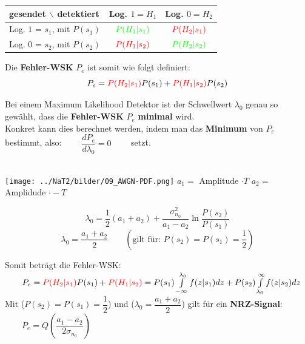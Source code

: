 \begin{minipage}[c]{10cm}
	\begin{center}
	 	\begin{tabular}{|l|c|c|}
			\hline
				gesendet $\backslash$ detektiert & Log. $1 = H_1$ & Log. $0 = H_2$ \\
			\hline
				Log. $1$ = $s_1$, mit $P(s_1)$ & $\textcolor{green}{P(H_1 | s_1)}$ 
												&  $\textcolor{red}{P(H_2 | s_1)}$\\
			\hline
				Log. $0$ = $s_2$, mit $P(s_2)$ & $\textcolor{red}{P(H_1 | s_2)}$ 
												& $\textcolor{green}{P(H_2 | s_2)}$ \\
			\hline
		\end{tabular}  
  	\end{center}
\end{minipage}
\begin{minipage}[c]{8cm}
	Die \textbf{Fehler-WSK} $P_e$ ist somit wie folgt definiert:
	$$ P_e = \textcolor{red}{P(H_2 | s_1)} P(s_1) + \textcolor{red}{P(H_1 | s_2)}
	P(s_2)$$
\end{minipage} 

Bei einem Maximum Likelihood Detektor ist der Schwellwert $\lambda_0$ genau so gewählt, dass die
\textbf{Fehler-WSK }$P_e$ \textbf{minimal} wird. \\
Konkret kann dies berechnet werden, indem man das \textbf{Minimum} von $P_e$ bestimmt, also: $\qquad
\dfrac{d P_e}{d \lambda_0} = 0 \qquad$ setzt. \\ \\

\begin{minipage}[c]{9.5cm}
 	\texttt{[image: ../NaT2/bilder/09\_AWGN-PDF.png]} \newline
 	$a_1 = $ Amplitude $\cdot T$ \newline
 	$a_2 = $ Amplidude $\cdot -T$
\end{minipage}
\begin{minipage}[c]{7cm}
	 $$ \lambda_0 = \dfrac{1}{2} (a_1 + a_2) + \dfrac{\sigma_{n_0}^2}{a_1 - a_2}
 \ln\dfrac{P(s_2)}{P(s_1)} $$ 
 	$$ \lambda_0 = \dfrac{a_1 + a_2}{2} \qquad (\text{gilt für: } P(s_2) = P(s_1) = \dfrac{1}{2})
 	$$
\end{minipage} 

Somit beträgt die Fehler-WSK: $ \qquad P_e = \textcolor{red}{P(H_2 | s_1)} P(s_1) + \textcolor{red}{P(H_1 | s_2)} = 
 P(s_1) \int\limits_{-\infty}^{\lambda_0} f(z|s_1) dz + P(s_2) \int\limits_{\lambda_0}^{\infty}
 f(z|s_2) dz$ \\
Mit ($P(s_2) = P(s_1) = \dfrac{1}{2}$) und ($\lambda_0 = \dfrac{a_1 + a_2}{2}$) gilt für ein
\textbf{NRZ-Signal}: $ \qquad P_e = Q \left(\dfrac{a_1 - a_2}{2 \sigma_{n_0}}\right) $



